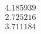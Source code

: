 \documentclass[preview]{standalone}
\begin{document}
\begin{align*}
4.185939 \\ 2.725216 \\ 3.711184
\end{align*}
\end{document}
